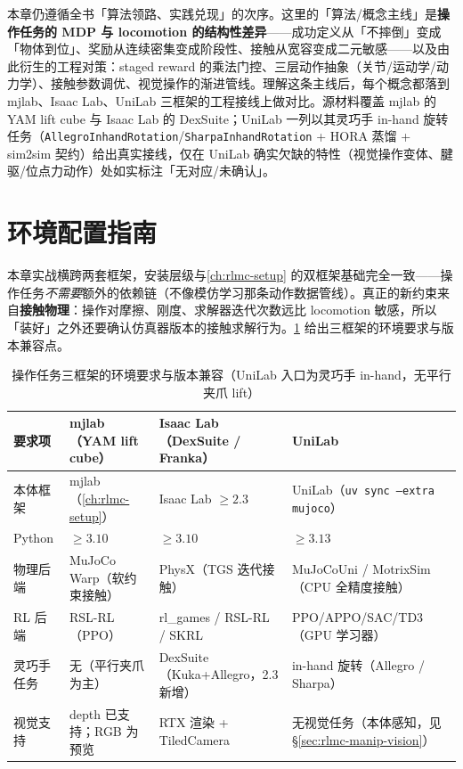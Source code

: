 本章仍遵循全书「算法领路、实践兑现」的次序。这里的「算法/概念主线」是\textbf{操作任务的 MDP 与 locomotion 的结构性差异}——成功定义从「不摔倒」变成「物体到位」、奖励从连续密集变成阶段性、接触从宽容变成二元敏感——以及由此衍生的工程对策：staged reward 的乘法门控、三层动作抽象（关节/运动学/动力学）、接触参数调优、视觉操作的渐进管线。理解这条主线后，每个概念都落到 mjlab、Isaac Lab、UniLab 三框架的工程接线上做对比。源材料覆盖 mjlab 的 YAM lift cube 与 Isaac Lab 的 DexSuite；UniLab 一列以其灵巧手 in-hand 旋转任务（\verb|AllegroInhandRotation|/\verb|SharpaInhandRotation| + HORA 蒸馏 + sim2sim 契约）给出真实接线，仅在 UniLab 确实欠缺的特性（视觉操作变体、腱驱/位点力动作）处如实标注「无对应/未确认」。

\section*{环境配置指南}
\label{sec:rlmc-manip-setup}

本章实战横跨两套框架，安装层级与\cref{ch:rlmc-setup} 的双框架基础完全一致——操作任务\emph{不需要}额外的依赖链（不像模仿学习那条动作数据管线）。真正的新约束来自\textbf{接触物理}：操作对摩擦、刚度、求解器迭代次数远比 locomotion 敏感，所以「装好」之外还要确认仿真器版本的接触求解行为。\cref{tab:rlmc-manip-req} 给出三框架的环境要求与版本兼容点。

\begin{table}[ht]
\centering
\small
\caption{操作任务三框架的环境要求与版本兼容（UniLab 入口为灵巧手 in-hand，无平行夹爪 lift）}
\label{tab:rlmc-manip-req}
\begin{tabular}{@{}llll@{}}
\toprule
要求项 & mjlab（YAM lift cube） & Isaac Lab（DexSuite / Franka） & UniLab \\
\midrule
本体框架 & mjlab（\cref{ch:rlmc-setup}） & Isaac Lab $\ge 2.3$ & UniLab（\texttt{uv sync --extra mujoco}） \\
Python & $\ge 3.10$ & $\ge 3.10$ & $\ge 3.13$ \\
物理后端 & MuJoCo Warp（软约束接触） & PhysX（TGS 迭代接触） & MuJoCoUni / MotrixSim（CPU 全精度接触） \\
RL 后端 & RSL-RL（PPO） & rl\_games / RSL-RL / SKRL & PPO/APPO/SAC/TD3（GPU 学习器） \\
灵巧手任务 & 无（平行夹爪为主） & DexSuite（Kuka+Allegro，2.3 新增） & in-hand 旋转（Allegro / Sharpa） \\
视觉支持 & depth 已支持；RGB 为预览 & RTX 渲染 + TiledCamera & 无视觉任务（本体感知，见 \S\ref*{sec:rlmc-manip-vision}） \\
\bottomrule
\end{tabular}
\end{table}

